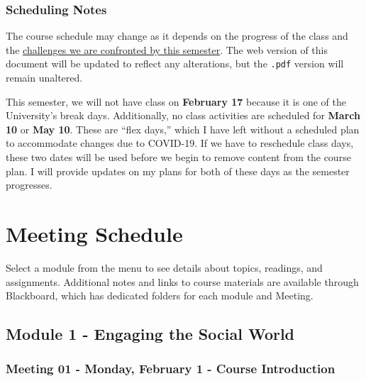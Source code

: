 \documentclass[
]{book}
\begin{document}
\hypertarget{scheduling-notes}{%
\subsection{Scheduling Notes}\label{scheduling-notes}}

The course schedule may change as it depends on the progress of the class and the \href{covid-19.html}{challenges we are confronted by this semester}. The web version of this document will be updated to reflect any alterations, but the \texttt{.pdf} version will remain unaltered.

This semester, we will not have class on \textbf{February 17} because it is one of the University's break days. Additionally, no class activities are scheduled for \textbf{March 10} or \textbf{May 10}. These are ``flex days,'' which I have left without a scheduled plan to accommodate changes due to COVID-19. If we have to reschedule class days, these two dates will be used before we begin to remove content from the course plan. I will provide updates on my plans for both of these days as the semester progresses.

\hypertarget{meeting-schedule}{%
\chapter{Meeting Schedule}\label{meeting-schedule}}

Select a module from the menu to see details about topics, readings, and assignments. Additional notes and links to course materials are available through Blackboard, which has dedicated folders for each module and Meeting.

\newpage

\hypertarget{module-1---engaging-the-social-world}{%
\section{Module 1 - Engaging the Social World}\label{module-1---engaging-the-social-world}}

\hypertarget{meeting-01---monday-february-1---course-introduction}{%
\subsection*{Meeting 01 - Monday, February 1 - Course Introduction}\label{meeting-01---monday-february-1---course-introduction}}
\end{document}

